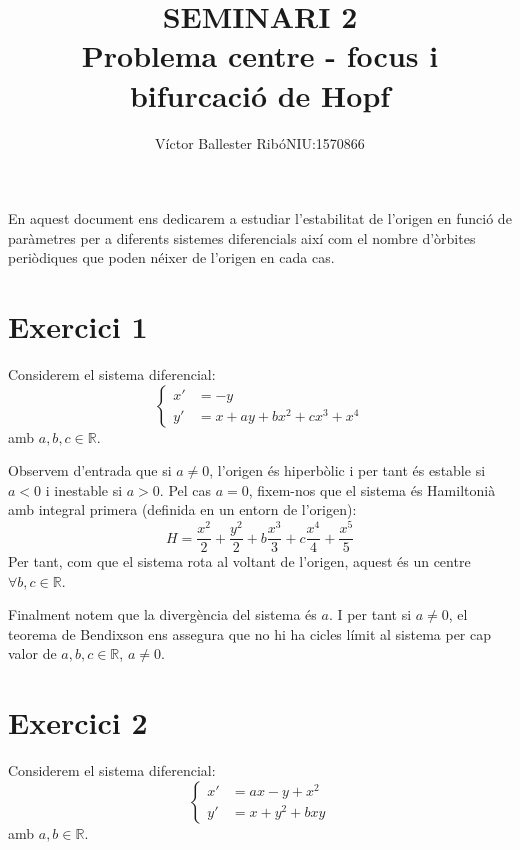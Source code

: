 \documentclass[a4paper]{article}
\title{\bfseries\large SEMINARI 2\\\vspace{0.25cm}Problema centre - focus i bifurcació de Hopf}
\author{Víctor Ballester Ribó\endgraf NIU:1570866}
\date{\parbox{\linewidth}{\centering
  Sistemes dinàmics\endgraf
  Grau en Matemàtiques\endgraf
  Universitat Autònoma de Barcelona\endgraf
  Gener de 2023}}
\newcommand{\RR}{\ensuremath{\mathbb{R}}} %
\theoremstyle{definition}
\begin{document}
\maketitle
En aquest document ens dedicarem a estudiar l'estabilitat de l'origen en funció de paràmetres per a diferents sistemes diferencials així com el nombre d'òrbites periòdiques que poden néixer de l'origen en cada cas.
\section*{Exercici 1}
Considerem el sistema diferencial:
\begin{equation}\label{sis1}
  \left\{
  \begin{aligned}
    x' & =-y                    \\
    y' & =x + ay +bx^2+cx^3+x^4
  \end{aligned}
  \right.
\end{equation}
amb $a,b,c\in\RR$.

Observem d'entrada que si $a\ne 0$, l'origen és hiperbòlic i per tant és estable si $a<0$ i inestable si $a>0$. Pel cas $a=0$, fixem-nos que el sistema és Hamiltonià amb integral primera (definida en un entorn de l'origen): $$H=\frac{x^2}{2}+\frac{y^2}{2}+b\frac{x^3}{3}+c\frac{x^4}{4}+\frac{x^5}{5}$$
Per tant, com que el sistema rota al voltant de l'origen, aquest és un centre $\forall b,c \in\RR$.

Finalment notem que la divergència del sistema és $a$. I per tant si $a\ne 0$, el teorema de Bendixson ens assegura que no hi ha cicles límit al sistema per cap valor de $a,b,c\in\RR$, $a\ne 0$.
\newpage
\section*{Exercici 2}
Considerem el sistema diferencial:
\begin{equation}\label{sis2}
  \left\{
  \begin{aligned}
    x' & =ax-y+x^2     \\
    y' & =x + y^2+b xy
  \end{aligned}
  \right.
\end{equation}
amb $a,b\in\RR$.
\end{document}
